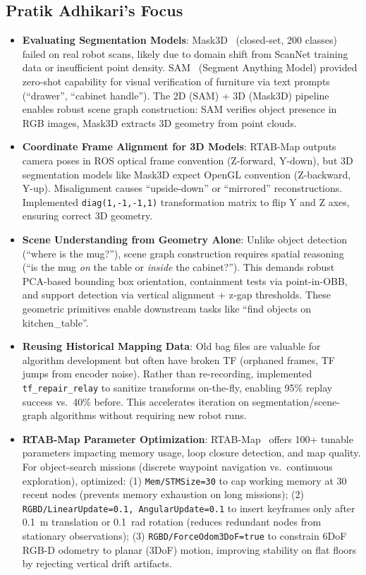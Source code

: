 \documentclass[12pt,oneside,a4paper]{article}
\begin{document}
\subsection{Pratik Adhikari's Focus}
\begin{itemize}
    \item \textbf{Evaluating Segmentation Models}: Mask3D~\cite{schult2023mask3d} (closed-set, 200 classes) failed on real robot scans, likely due to domain shift from ScanNet training data or insufficient point density. SAM~\cite{kirillov2023sam} (Segment Anything Model) provided zero-shot capability for visual verification of furniture via text prompts (``drawer'', ``cabinet handle''). The 2D (SAM) + 3D (Mask3D) pipeline enables robust scene graph construction: SAM verifies object presence in RGB images, Mask3D extracts 3D geometry from point clouds.
    \item \textbf{Coordinate Frame Alignment for 3D Models}: RTAB-Map outputs camera poses in ROS optical frame convention (Z-forward, Y-down), but 3D segmentation models like Mask3D expect OpenGL convention (Z-backward, Y-up). Misalignment causes ``upside-down'' or ``mirrored'' reconstructions. Implemented \texttt{diag(1,-1,-1,1)} transformation matrix to flip Y and Z axes, ensuring correct 3D geometry.
    \item \textbf{Scene Understanding from Geometry Alone}: Unlike object detection (``where is the mug?''), scene graph construction requires spatial reasoning (``is the mug \emph{on} the table or \emph{inside} the cabinet?''). This demands robust PCA-based bounding box orientation, containment tests via point-in-OBB, and support detection via vertical alignment + z-gap thresholds. These geometric primitives enable downstream tasks like ``find objects on kitchen\_table''.
    \item \textbf{Reusing Historical Mapping Data}: Old bag files are valuable for algorithm development but often have broken TF (orphaned frames, TF jumps from encoder noise). Rather than re-recording, implemented \texttt{tf\_repair\_relay} to sanitize transforms on-the-fly, enabling 95\% replay success vs.\ 40\% before. This accelerates iteration on segmentation/scene-graph algorithms without requiring new robot runs.
    
    \item \textbf{RTAB-Map Parameter Optimization}: RTAB-Map~\cite{labbe2013rtabmap} offers 100+ tunable parameters impacting memory usage, loop closure detection, and map quality. For object-search missions (discrete waypoint navigation vs.\ continuous exploration), optimized: (1) \texttt{Mem/STMSize=30} to cap working memory at 30 recent nodes (prevents memory exhaustion on long missions); (2) \texttt{RGBD/LinearUpdate=0.1, AngularUpdate=0.1} to insert keyframes only after 0.1~m translation or 0.1~rad rotation (reduces redundant nodes from stationary observations); (3) \texttt{RGBD/ForceOdom3DoF=true} to constrain 6DoF RGB-D odometry to planar (3DoF) motion, improving stability on flat floors by rejecting vertical drift artifacts.
\end{itemize}
\end{document}
